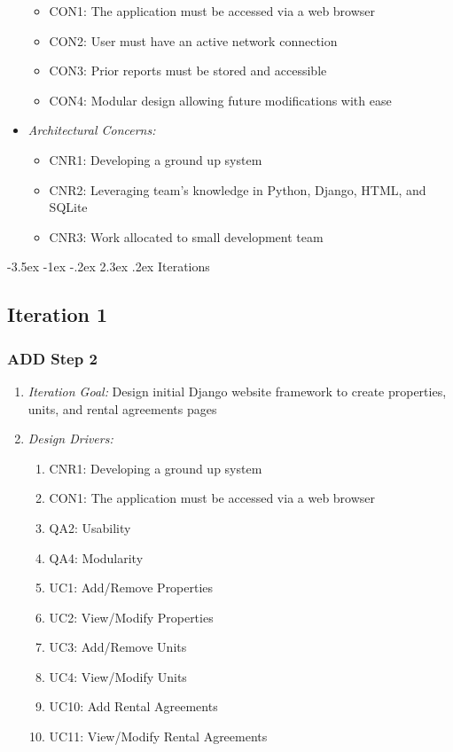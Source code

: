 \documentclass[11pt]{article}
\makeatletter
\renewcommand\section{\@startsection{section}{1}{\z@}%
                                  {-3.5ex \@plus -1ex \@minus -.2ex}%
                                  {2.3ex \@plus.2ex}%
                                  {\normalfont\large\bfseries}}
\renewcommand\section{\@startsection{section}{1}{\z@}%
                                  {-3.5ex \@plus -1ex \@minus -.2ex}%
                                  {2.3ex \@plus.2ex}%
                                  {\normalfont\large\bfseries}}
\makeatother
\begin{document}
\begin{itemize}
            \begin{itemize}
                \item CON1: The application must be accessed via a web browser
                \item CON2: User must have an active network connection
                \item CON3: Prior reports must be stored and accessible
                \item CON4: Modular design allowing future modifications with ease
            \end{itemize}
        \item \textit{Architectural Concerns:}
            \begin{itemize}
                \item CNR1: Developing a ground up system 
                \item CNR2: Leveraging team’s knowledge in Python, Django, HTML, and SQLite
                \item CNR3: Work allocated to small development team
            \end{itemize}
    \end{itemize}

\section{Iterations}
    \subsection{Iteration 1}
        \subsubsection{ADD Step 2}
            \begin{enumerate}
                \item \textit{Iteration Goal:} Design initial Django website framework to create properties, units, and rental agreements pages
                \item \textit{Design Drivers:}
                    \begin{enumerate}
                        \item CNR1: Developing a ground up system
                        \item CON1: The application must be accessed via a web browser
                        \item QA2: Usability
                        \item QA4: Modularity
                        \item UC1: Add/Remove Properties
                        \item UC2: View/Modify Properties 
                        \item UC3: Add/Remove Units  
                        \item UC4: View/Modify Units
                        \item UC10: Add Rental Agreements
                        \item UC11: View/Modify Rental Agreements
                    \end{enumerate}
            \end{enumerate}
\end{document}
